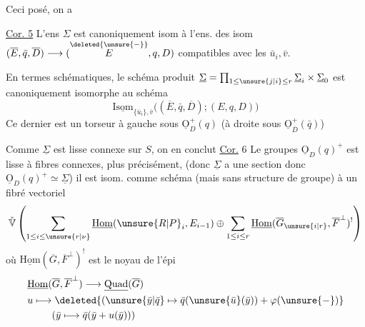 Ceci posé, on a

\uline{Cor. 5} L'ens $\Sigma$ est canoniquement isom à l'ens. des isom $(\overline E,\bar q,\overline D)\longrightarrow(\overset{\deleted{\unsure{-}}}{E},q,D)$ compatibles avec les $\bar u_i,\bar v$.

En termes schématiques, le schéma produit $\underline\Sigma=\prod_{1\leq\unsure{j|i}\leq r}\underline\Sigma_i\times\underline\Sigma_0$ est canoniquement isomorphe au schéma
\[
\underline{\mathrm{Isom}}_{\{\bar u_i\},\bar v}\big((\overline E,\bar q,\overline D);(E,q,D)\big)
\]
%
Ce dernier est un torseur à gauche sous $\underline{\mathrm O}_D^+(q)$ (à droite sous $\underline{\mathrm O}_{\overline D}^{+}(\bar q)$)

Comme $\underline\Sigma$ est  lisse connexe sur $S$, on en conclut
\uline{Cor.} 6 Le  groupes $\underline{\mathrm O}_D(q)^+$ est lisse à fibres connexes, plus précisément,   (donc $\underline\Sigma$ a une section donc $\underline{\mathrm O}_D(q)^+\simeq\underline\Sigma$) il est isom. comme schéma (mais sans structure de groupe) à un fibré  vectoriel
\[
\check{\mathbb V}\left(\sum_{1\leq i\leq\unsure{r|\nu}}\underline{\mathrm{Hom}}(\unsure{R|P}_i,E_{i-1})\oplus\sum_{1\leq i\leq r}\underline{\mathrm{Hom}}(\overline G_{\unsure{i|r}},\overline F^\perp)^{!}\right)
\]
où $\underline{\mathrm{Hom}}(\overline G,\overline F^\perp)^{!}$ est le noyau de l'épi
\[
\begin{aligned}
&\underline{\mathrm{Hom}}(\overline G,\overline F^\perp)\longrightarrow\underline{\mathrm{Quad}}(\overline G)\\
&u\longmapsto\deleted{(\unsure{\bar y|\bar q}\mapsto\bar q(\unsure{\bar u}(\bar y))+\varphi(\unsure{-})}\\
&\hphantom{u\longmapsto}(\bar y\longmapsto\bar q(\bar y+u(\bar y)))
\end{aligned}
\]

